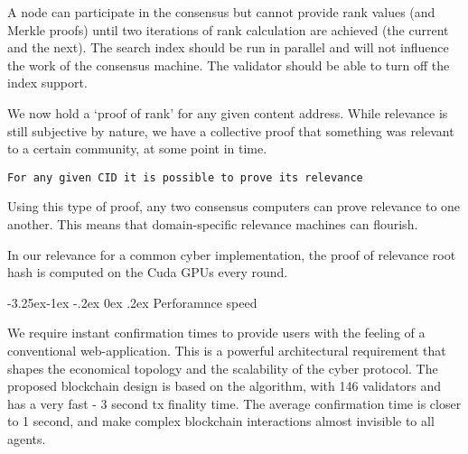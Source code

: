 \documentclass[8pt,oneside]{amsart}
\makeatletter
\newcommand{\linkgreen}[2]{\href{#1}{\color{green}{#2}}}
\renewcommand\subsection{\@startsection{subsection}{2}{\z@}%
                                     {-3.25ex\@plus -1ex \@minus -.2ex}%
                                     {0ex \@plus .2ex}%
                                     {\play\Large}}%
\newcommand{\titleSection}[1]{\subsection{#1}}
\newcommand{\code}[1]{{\PlayBold #1}}
\makeatother
\begin{document}
\begin{Abstract}
A node can participate in the consensus but cannot provide rank values (and Merkle proofs) until two iterations of rank calculation are achieved (the current and the next). The search index should be run in parallel and will not influence the work of the consensus machine. The validator should be able to turn off the index support.

We now hold a ‘proof of rank’ for any given content address. While relevance is still subjective by nature, we have a collective proof that something was relevant to a certain community, at some point in time.

\begin{lstlisting}
For any given CID it is possible to prove its relevance
\end{lstlisting}

Using this type of proof, any two \linkgreen{https://ipfs.io/ipfs/QmdCeixQUHBjGnKfwbB1dxf4X8xnadL8xWmmEnQah5n7x2}{IBC compatible} consensus computers can prove relevance to one another. This means that domain-specific relevance machines can flourish.

In our relevance for a common \code{cyber} implementation, the proof of relevance root hash is computed on the Cuda GPUs every round.

\titleSection{Perforamnce speed}\label{Performance speed}

We require instant confirmation times to provide users with the feeling of a conventional web-application. This is a powerful architectural requirement that shapes the economical topology and the scalability of the cyber protocol. The proposed blockchain design is based on the \linkgreen{https://ipfs.io/ipfs/QmaMtD7xDgghqgjN62zWZ5TBGFiEjGQtuZBjJ9sMh816KJ}{Tendermint consensus} algorithm, with 146 validators and has a very fast - 3 second tx finality time. The average confirmation time is closer to 1 second, and make complex blockchain interactions almost invisible to all agents.


\end{Abstract}
\end{document}
